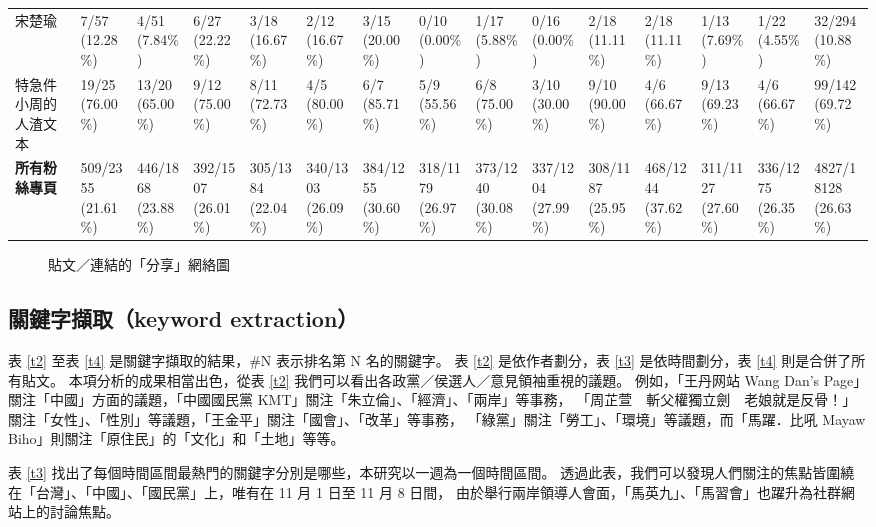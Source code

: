 \documentclass[a4paper, 10pt, conference]{ieeeconf}       %
\begin{document}
\begin{CJK}{UTF8}{bsmi}
\begin{landscape}
\begin{longtable}[c]{@{}L{2.45cm}L{1.1cm}L{1.1cm}L{1.1cm}L{1.1cm}L{1.1cm}L{1.1cm}L{1.1cm}L{1.1cm}L{1.1cm}L{1.1cm}L{1.1cm}L{1.1cm}L{1.1cm}L{1.1cm}@{}}
\fi
宋楚瑜 & 7/57 (12.28\%) & 4/51 (7.84\%) & 6/27 (22.22\%) & 3/18 (16.67\%) & 2/12 (16.67\%) & 3/15 (20.00\%) & 0/10 (0.00\%) & 1/17 (5.88\%) & 0/16 (0.00\%) & 2/18 (11.11\%) & 2/18 (11.11\%) & 1/13 (7.69\%) & 1/22 (4.55\%) & 32/294 (10.88\%) \\
特急件小周的人渣文本 & 19/25 (76.00\%) & 13/20 (65.00\%) & 9/12 (75.00\%) & 8/11 (72.73\%) & 4/5 (80.00\%) & 6/7 (85.71\%) & 5/9 (55.56\%) & 6/8 (75.00\%) & 3/10 (30.00\%) & 9/10 (90.00\%) & 4/6 (66.67\%) & 9/13 (69.23\%) & 4/6 (66.67\%) & 99/142 (69.72\%) \\
{\bfseries 所有粉絲專頁} & 509/2355 (21.61\%) & 446/1868 (23.88\%) & 392/1507 (26.01\%) & 305/1384 (22.04\%) & 340/1303 (26.09\%) & 384/1255 (30.60\%) & 318/1179 (26.97\%) & 373/1240 (30.08\%) & 337/1204 (27.99\%) & 308/1187 (25.95\%) & 468/1244 (37.62\%) & 311/1127 (27.60\%) & 336/1275 (26.35\%) & 4827/18128 (26.63\%) \\* \bottomrule
\end{longtable}
\end{landscape}

\begin{figure}[!htbp]
%
\caption{貼文／連結的「分享」網絡圖}
\label{f4}
\end{figure}

\twocolumn

\subsection*{關鍵字擷取（keyword extraction）}

表 \ref{t2} 至表 \ref{t4} 是關鍵字擷取的結果，\#N 表示排名第 N 名的關鍵字。%
表 \ref{t2} 是依作者劃分，表 \ref{t3} 是依時間劃分，表 \ref{t4} 則是合併了所有貼文。%
本項分析的成果相當出色，從表 \ref{t2} 我們可以看出各政黨／侯選人／意見領袖重視的議題。%
例如，「王丹网站 Wang Dan's Page」關注「中國」方面的議題，「中國國民黨 KMT」關注「朱立倫」、「經濟」、「兩岸」等事務，%
「周芷萱　斬父權獨立劍　老娘就是反骨！」關注「女性」、「性別」等議題，「王金平」關注「國會」、「改革」等事務，%
「綠黨」關注「勞工」、「環境」等議題，而「馬躍．比吼 Mayaw Biho」則關注「原住民」的「文化」和「土地」等等。%

表 \ref{t3} 找出了每個時間區間最熱門的關鍵字分別是哪些，本研究以一週為一個時間區間。%
透過此表，我們可以發現人們關注的焦點皆圍繞在「台灣」、「中國」、「國民黨」上，唯有在 11 月 1 日至 11 月 8 日間，%
由於舉行兩岸領導人會面，「馬英九」、「馬習會」也躍升為社群網站上的討論焦點。%


\end{CJK}
\end{document}
